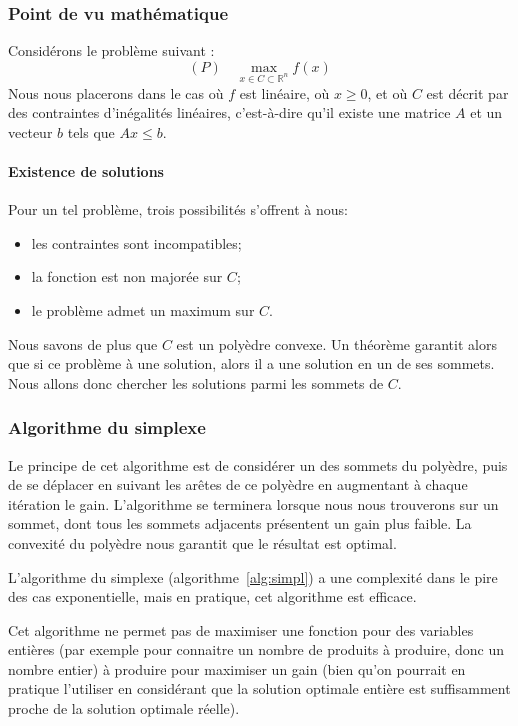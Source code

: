   \subsubsection{Point de vu mathématique}
      Considérons le problème suivant :
      $$ (P) \quad \max_{x\in C \subset \mathbb{R}^n} f(x)$$
      Nous nous placerons dans le cas où $f$ est linéaire, où $x \geqslant 0$,
      et où $C$ est décrit par des contraintes d'inégalités linéaires,
      c'est-à-dire qu'il existe une matrice $A$ et un vecteur $b$ tels
      que $Ax\leqslant b$.

    \paragraph{Existence de solutions}
      Pour un tel problème, trois possibilités s'offrent à nous:
      \begin{itemize}
        \item les contraintes sont incompatibles;
        \item la fonction est non majorée sur $C$;
        \item le problème admet un maximum sur $C$.
      \end{itemize}
      Nous savons de plus que $C$ est un polyèdre convexe. Un théorème garantit
      alors que si ce problème à une solution, alors il a une solution en un de
      ses sommets. Nous allons donc chercher les solutions parmi les sommets de
      $C$.

  \subsubsection{Algorithme du simplexe}
    Le principe de cet algorithme est de considérer un des sommets du polyèdre,
    puis de se déplacer en suivant les arêtes de ce polyèdre en augmentant à
    chaque itération le gain. L'algorithme se terminera lorsque nous nous 
    trouverons sur un sommet, dont tous les sommets adjacents présentent un gain
    plus faible. La convexité du polyèdre nous garantit que le résultat est 
    optimal.

    L'algorithme du simplexe (algorithme~\ref{alg:simpl}) a une complexité dans
    le pire des cas exponentielle, mais en pratique, cet algorithme est
    efficace.
    
    Cet algorithme ne permet pas de maximiser une fonction pour des variables
    entières (par exemple pour connaitre un nombre de produits à produire, donc
    un nombre entier) à produire pour maximiser un gain (bien qu'on pourrait en
    pratique l'utiliser en considérant que la solution optimale entière est
    suffisamment proche de la solution optimale réelle).

